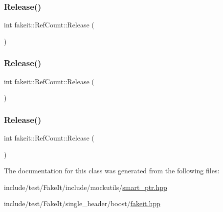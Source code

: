 \mbox{\label{classfakeit_1_1RefCount_a2e5ed9531fd9695ebec2ac2746828a58}} 
\subsubsection{\texorpdfstring{Release()}{Release()}\hspace{0.1cm}{\footnotesize\ttfamily [7/9]}}
{\footnotesize\ttfamily int fakeit\+::\+Ref\+Count\+::\+Release (\begin{DoxyParamCaption}{ }\end{DoxyParamCaption})\hspace{0.3cm}{\ttfamily [inline]}}

\mbox{\label{classfakeit_1_1RefCount_a2e5ed9531fd9695ebec2ac2746828a58}} 
\subsubsection{\texorpdfstring{Release()}{Release()}\hspace{0.1cm}{\footnotesize\ttfamily [8/9]}}
{\footnotesize\ttfamily int fakeit\+::\+Ref\+Count\+::\+Release (\begin{DoxyParamCaption}{ }\end{DoxyParamCaption})\hspace{0.3cm}{\ttfamily [inline]}}

\mbox{\label{classfakeit_1_1RefCount_a2e5ed9531fd9695ebec2ac2746828a58}} 
\subsubsection{\texorpdfstring{Release()}{Release()}\hspace{0.1cm}{\footnotesize\ttfamily [9/9]}}
{\footnotesize\ttfamily int fakeit\+::\+Ref\+Count\+::\+Release (\begin{DoxyParamCaption}{ }\end{DoxyParamCaption})\hspace{0.3cm}{\ttfamily [inline]}}



The documentation for this class was generated from the following files\+:\begin{DoxyCompactItemize}
\item 
include/test/\+Fake\+It/include/mockutils/\mbox{\hyperlink{smart__ptr_8hpp}{smart\+\_\+ptr.\+hpp}}\item 
include/test/\+Fake\+It/single\+\_\+header/boost/\mbox{\hyperlink{single__header_2boost_2fakeit_8hpp}{fakeit.\+hpp}}\end{DoxyCompactItemize}
